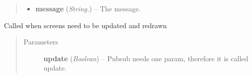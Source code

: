 \documentclass[letterpaper,10pt,english]{sphinxmanual}
\begin{document}
\begin{fulllineitems}
\begin{fulllineitems}
\begin{quote}
\begin{description}
\begin{itemize}
\item {} 
\textbf{message} (\emph{String.}) -- The message.

\end{itemize}

\end{description}\end{quote}

\end{fulllineitems}


\begin{fulllineitems}
\label{api:wos.GUI.UpdateScreens}
Called when screens need to be updated and redrawn
\begin{quote}\begin{description}
\item[{Parameters}] \leavevmode
\textbf{update} (\emph{Boolean}) -- Pubsub needs one param, therefore it is called update.

\end{description}\end{quote}

\end{fulllineitems}


\end{fulllineitems}

\end{document}
